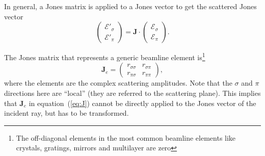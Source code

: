 \documentclass{iucr}
\begin{document}
In general, a Jones matrix is applied to a Jones vector to get the scattered Jones vector
\begin{equation}\label{eq:applyJones}
    \begin{pmatrix}
        \mathcal{E}'_\sigma \\
        \mathcal{E}'_\pi
    \end{pmatrix}
    =
    \textbf{J}
    \cdot
    \begin{pmatrix}
        \mathcal{E}_\sigma\\
        \mathcal{E}_\pi
    \end{pmatrix}.
\end{equation}

The Jones matrix that represents a generic beamline element is\footnote{The off-diagonal elements in the most common beamline elements like crystals, gratings, mirrors and multilayer are zero}
\begin{equation}\label{eq:J}
\textbf{J}_e = 
\begin{pmatrix}
r_{\sigma\sigma} & r_{\sigma\pi}\\
r_{\pi\sigma} & r_{\pi\pi}
\end{pmatrix},
\end{equation}
where the elements are the complex scattering amplitudes.
Note that the $\sigma$ and $\pi$ directions here are ``local'' (they are referred to the scattering plane).
This implies that $\textbf{J}_e$ in equation~(\ref{eq:J}) cannot be directly applied to the Jones vector of the incident ray, but has to be transformed. 
\end{document}
